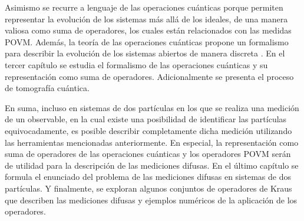 Asimismo se recurre a lenguaje de las operaciones cuánticas porque permiten representar la evolución de los sistemas más allá de los ideales, de una manera valiosa como suma de operadores, los cuales están relacionados con las medidas POVM\@. Además, la teoría de las operaciones cuánticas propone un formalismo para describir la evolución de los sistemas abiertos de manera discreta {\cite{nielsen_chuang_2010}}. En el tercer capítulo se estudia el formalismo de las operaciones cuánticas y su representación como suma de operadores. Adicionalmente se presenta el proceso de tomografía cuántica.



En suma, incluso en sistemas de dos partículas en los que se realiza una medición de un observable, en la cual existe una posibilidad de identificar las partículas equivocadamente, es posible describir completamente dicha medición utilizando las herramientas mencionadas anteriormente. En especial, la representación como suma de operadores de las operaciones cuánticas y los operadores POVM serán de utilidad para la descripción de las mediciones difusas. En el último capítulo se formula el enunciado del problema de las mediciones difusas en sistemas de dos partículas. Y finalmente, se exploran algunos conjuntos de operadores de Kraus que describen las mediciones difusas y ejemplos numéricos de la aplicación de los operadores. 

 



